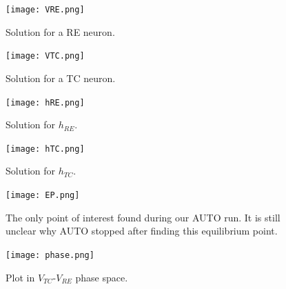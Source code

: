 \documentclass[12pt,letterpaper,oneside,openany]{article}
\begin{document}
\begin{figure}[t]
  \centering
  \texttt{[image: VRE.png]}
  \caption{Solution for a RE neuron.}
  \label{fig:VRE}
\end{figure}

\begin{figure}[t]
  \centering
  \texttt{[image: VTC.png]}
  \caption{Solution for a TC neuron.}
  \label{fig:VTC}
\end{figure}

\begin{figure}[t]
  \centering
  \texttt{[image: hRE.png]}
  \caption{Solution for $h_{RE}$.}
  \label{fig:hRE}
\end{figure}

\begin{figure}[t]
  \centering
  \texttt{[image: hTC.png]}
  \caption{Solution for $h_{TC}$.}
  \label{fig:hTC}
\end{figure}

\begin{figure}[t]
  \centering
  \texttt{[image: EP.png]}
  \caption{The only point of interest found during our AUTO run. It is still unclear why AUTO stopped after finding this equilibrium point.}
  \label{fig:EP}
\end{figure}

\begin{figure}[t]
  \centering
  \texttt{[image: phase.png]}
  \caption{Plot in $V_{TC}$-$V_{RE}$ phase space.}
  \label{fig:phase}
\end{figure}














\end{document}
